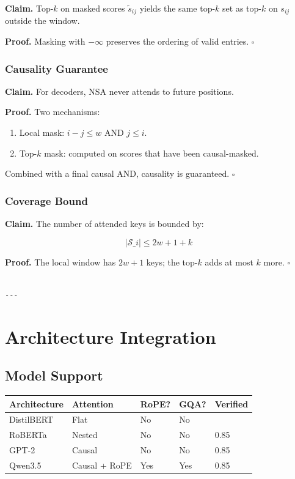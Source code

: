 \textbf{Claim.} Top-$k$ on masked scores $\tilde{s}_{ij}$ yields the same top-$k$ 
set as top-$k$ on $s_{ij}$ outside the window.

\textbf{Proof.} Masking with $-\infty$ preserves the ordering of valid entries. 
$\square$

\subsubsection{Causality Guarantee}

\textbf{Claim.} For decoders, NSA never attends to future positions.

\textbf{Proof.} Two mechanisms:
\begin{enumerate}
\item Local mask: $i - j \leq w$ AND $j \leq i$.
\item Top-$k$ mask: computed on scores that have been causal-masked.

\end{enumerate}
Combined with a final causal AND, causality is guaranteed. $\square$

\subsubsection{Coverage Bound}

\textbf{Claim.} The number of attended keys is bounded by:

\[
|\mathcal{S}\_i| \leq 2w + 1 + k
\tag{4.11}
\]

\textbf{Proof.} The local window has $2w + 1$ keys; the top-$k$ adds at most $k$ 
more. $\square$
\begin{lstlisting}

---
\end{lstlisting}


\section{Architecture Integration}

\subsection{Model Support}

\begin{table}[H]
\centering
\small
\begin{tabular}{lllll}
\toprule
\textbf{Architecture} & \textbf{Attention} & \textbf{RoPE?} & \textbf{GQA?} & \textbf{Verified} \\
\midrule
DistilBERT & Flat & No & No &  \\
RoBERTa & Nested & No & No & 0.85 \\
GPT-2 & Causal & No & No & 0.85 \\
Qwen3.5 & Causal + RoPE & Yes & Yes & 0.85 \\
\bottomrule
\end{tabular}
\end{table}

